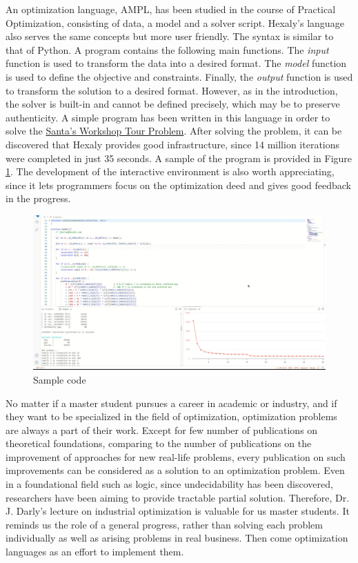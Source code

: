An optimization language, AMPL, has been studied in the course of Practical Optimization, consisting of data, a model and a solver script. Hexaly's language also serves the same concepts but more user friendly. The syntax is similar to that of Python. A program contains the following main functions. The \textit{input} function is used to transform the data into a desired format. The \textit{model} function is used to define the objective and constraints. Finally, the \textit{output} function is used to transform the solution to a desired format. However, as in the introduction, the solver is built-in and cannot be defined precisely, which may be to preserve authenticity. A simple program has been written in this language in order to solve the \href{https://www.kaggle.com/c/santa-workshop-tour-2019}{Santa's Workshop Tour Problem}. After solving the problem, it can be discovered that Hexaly provides good infrastructure, since 14 million iterations were completed in just 35 seconds. A sample of the program is provided in Figure \ref{fig:sample}. The development of the interactive environment is also worth appreciating, since it lets programmers focus on the optimization deed and gives good feedback in the progress.

\begin{figure}[ht]
    \centering
    \includegraphics[width=\textwidth]{img/code.png}
    \caption{Sample code}
    \label{fig:sample}
\end{figure}

No matter if a master student pursues a career in academic or industry, and if they want to be specialized in the field of optimization, optimization problems are always a part of their work. Except for few number of publications on theoretical foundations, comparing to the number of publications on the improvement of approaches for new real-life problems, every publication on such improvements can be considered as a solution to an optimization problem. Even in a foundational field such as logic, since undecidability has been discovered, researchers have been aiming to provide tractable partial solution. Therefore, Dr. J. Darly's lecture on industrial optimization is valuable for us master students. It reminds us the role of a general progress, rather than solving each problem individually as well as arising problems in real business. Then come optimization languages as an effort to implement them.
